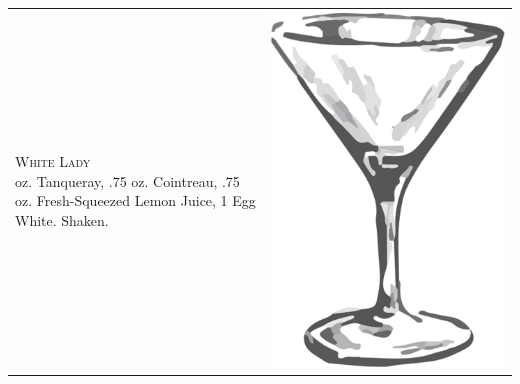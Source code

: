 \documentclass{article}
\begin{document}
\begin{tabular}{*{2}{m{}}}
{\raggedleft\huge\textsc{White Lady}\\*}
\raggedleft 2 oz. Tanqueray, .75 oz. Cointreau, .75 oz. Fresh-Squeezed Lemon Juice, 1 Egg White. Shaken. & \includegraphics{goblet.png}\\
\end{tabular}
\end{document}

